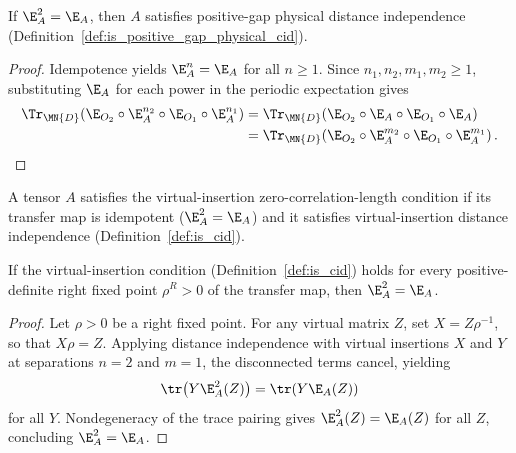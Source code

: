 \begin{lemma}%
    \label{thm:is_positive_gap_physical_cid_of_is_rfp}
    \leanok
    If $\E_A^2=\E_A$, then $A$ satisfies positive-gap physical distance
    independence (Definition~\ref{def:is_positive_gap_physical_cid}).
\end{lemma}
\begin{proof}\leanok
    Idempotence yields $\E_A^n=\E_A$ for all $n\ge1$. Since
    $n_1,n_2,m_1,m_2\ge1$, substituting $\E_A$ for each power in the periodic
    expectation gives
    \begin{align}
        \Tr_{\MN{D}}\!\left(\E_{O_2}\circ\E_A^{n_2}\circ\E_{O_1}\circ\E_A^{n_1}\right)
         & =
        \Tr_{\MN{D}}\!\left(\E_{O_2}\circ\E_A\circ\E_{O_1}\circ\E_A\right)
        \notag \\
         & =
        \Tr_{\MN{D}}\!\left(\E_{O_2}\circ\E_A^{m_2}\circ\E_{O_1}\circ\E_A^{m_1}\right).
        \notag
    \end{align}
\end{proof}

\begin{definition}\label{def:is_zcl}
    \leanok
    A tensor $A$ satisfies the virtual-insertion zero-correlation-length
    condition if its transfer map is idempotent ($\E_A^2=\E_A$) and it satisfies
    virtual-insertion distance independence (Definition~\ref{def:is_cid}).
\end{definition}

\begin{lemma}%
    \label{thm:isCID_implies_isTransferIdempotent}
    \leanok
    If the virtual-insertion condition (Definition~\ref{def:is_cid}) holds for
    every positive-definite right fixed point $\rho^R>0$ of the transfer map,
    then $\E_A^2=\E_A$.
\end{lemma}
\begin{proof}\leanok
    Let $\rho>0$ be a right fixed point. For any virtual matrix $Z$, set
    $X=Z\rho^{-1}$, so that $X\rho=Z$. Applying distance independence with
    virtual insertions $X$ and $Y$ at separations $n=2$ and $m=1$, the
    disconnected terms cancel, yielding
    \begin{align}
        \tr\!\left(Y\E_A^2(Z)\right) = \tr\!\left(Y\E_A(Z)\right)
        \notag
    \end{align}
    for all $Y$. Nondegeneracy of the trace pairing gives $\E_A^2(Z)=\E_A(Z)$
    for all $Z$, concluding $\E_A^2=\E_A$.
\end{proof}

